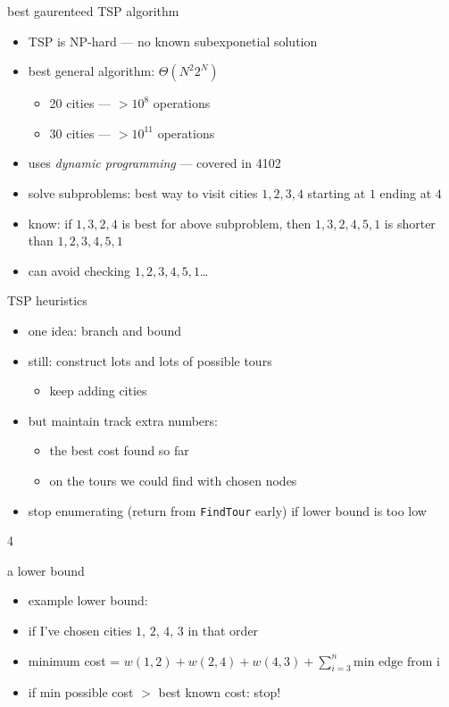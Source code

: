 \begin{frame}{best gaurenteed TSP algorithm}
\begin{itemize}
\item TSP is NP-hard --- no known subexponetial solution
\item best general algorithm: $\Theta(N^2 2^N)$
    \begin{itemize}
    \item 20 cities --- $>10^8$ operations
    \item 30 cities --- $>10^{11}$ operations
    \end{itemize}
\item uses \textit{dynamic programming} --- covered in 4102
\vspace{.5cm}
\item<2-> solve subproblems: best way to visit cities ${1,2,3,4}$ starting at $1$ ending at $4$
\item<2-> know: if $1,3,2,4$ is best for above subproblem, then $1,3,2,4,5,1$ is shorter than $1,2,3,4,5,1$
\item<2-> can avoid checking $1,2,3,4,5,1$\ldots
\end{itemize}
\end{frame}

\begin{frame}{TSP heuristics}
\begin{itemize}
\item one idea: branch and bound
\item still: construct lots and lots of possible tours
    \begin{itemize}
    \item keep adding cities
    \end{itemize}
\item but maintain track extra numbers:
    \begin{itemize}
    \item the best cost found so far
    \item {} on the tours we could find with chosen nodes
    \end{itemize}
\item stop enumerating (return from \texttt{FindTour} early) if lower bound is too low
\end{itemize}
4\end{frame}

\begin{frame}{a lower bound}
\begin{itemize}
\item example lower bound:
\vspace{.5cm}
\item if I've chosen cities $1$, $2$, $4$, $3$ in that order
\item minimum cost = $w(1,2)+w(2,4)+w(4,3)+\sum_{i=3}^n\text{min edge from i}$
\item if min possible cost $>$ best known cost: stop!
\end{itemize}
\end{frame}

